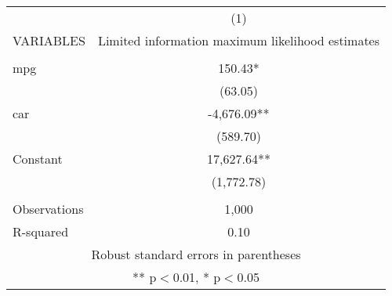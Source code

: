 \begin{tabular}{lc} \hline
 & (1) \\
VARIABLES & Limited information maximum likelihood estimates \\ \hline
 &  \\
mpg & 150.43* \\
 & (63.05) \\
car & -4,676.09** \\
 & (589.70) \\
Constant & 17,627.64** \\
 & (1,772.78) \\
 &  \\
Observations & 1,000 \\
 R-squared & 0.10 \\ \hline
\multicolumn{2}{c}{ Robust standard errors in parentheses} \\
\multicolumn{2}{c}{ ** p$<$0.01, * p$<$0.05} \\
\end{tabular}
